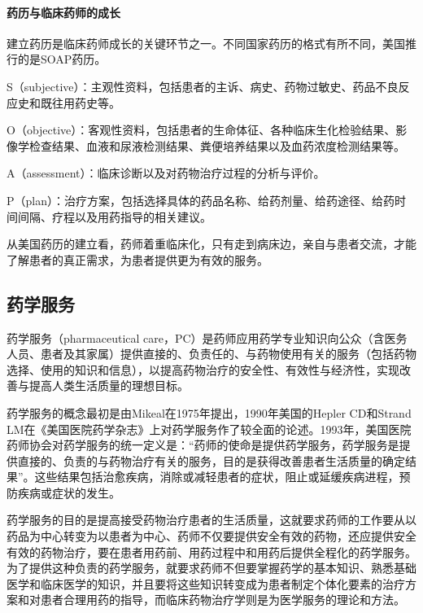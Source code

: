 \paragraph{药历与临床药师的成长}

建立药历是临床药师成长的关键环节之一。不同国家药历的格式有所不同，美国推行的是SOAP药历。

S（subjective）：主观性资料，包括患者的主诉、病史、药物过敏史、药品不良反应史和既往用药史等。

O（objective）：客观性资料，包括患者的生命体征、各种临床生化检验结果、影像学检查结果、血液和尿液检测结果、粪便培养结果以及血药浓度检测结果等。

A（assessment）：临床诊断以及对药物治疗过程的分析与评价。

P（plan）：治疗方案，包括选择具体的药品名称、给药剂量、给药途径、给药时间间隔、疗程以及用药指导的相关建议。

从美国药历的建立看，药师着重临床化，只有走到病床边，亲自与患者交流，才能了解患者的真正需求，为患者提供更为有效的服务。

\subsection{药学服务}

药学服务（pharmaceutical
care，PC）是药师应用药学专业知识向公众（含医务人员、患者及其家属）提供直接的、负责任的、与药物使用有关的服务（包括药物选择、使用的知识和信息），以提高药物治疗的安全性、有效性与经济性，实现改善与提高人类生活质量的理想目标。

药学服务的概念最初是由Mikeal在1975年提出，1990年美国的Hepler CD和Strand
LM在《美国医院药学杂志》上对药学服务作了较全面的论述。1993年，美国医院药师协会对药学服务的统一定义是：“药师的使命是提供药学服务，药学服务是提供直接的、负责的与药物治疗有关的服务，目的是获得改善患者生活质量的确定结果”。这些结果包括治愈疾病，消除或减轻患者的症状，阻止或延缓疾病进程，预防疾病或症状的发生。

药学服务的目的是提高接受药物治疗患者的生活质量，这就要求药师的工作要从以药品为中心转变为以患者为中心、药师不仅要提供安全有效的药物，还应提供安全有效的药物治疗，要在患者用药前、用药过程中和用药后提供全程化的药学服务。为了提供这种负责的药学服务，就要求药师不但要掌握药学的基本知识、熟悉基础医学和临床医学的知识，并且要将这些知识转变成为患者制定个体化要素的治疗方案和对患者合理用药的指导，而临床药物治疗学则是为医学服务的理论和方法。

